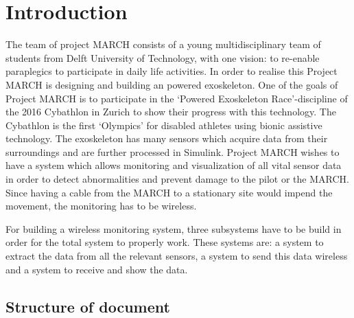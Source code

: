 \chapter{Introduction}
The team of project MARCH consists of a young multidisciplinary team of students from Delft University of Technology, with one vision: to re-enable paraplegics to participate in daily life activities. In order to realise this Project MARCH is designing and building an
powered exoskeleton. One of the goals of Project MARCH is to participate in the ‘Powered Exoskeleton Race’-discipline
of the 2016 Cybathlon in Zurich to show their progress with this technology. The Cybathlon is the first ‘Olympics’ for disabled athletes
using bionic assistive technology. 
The exoskeleton has many sensors which acquire data from their surroundings and are further processed in Simulink. Project MARCH wishes to have a system which allows monitoring and visualization of all vital sensor data in order to detect abnormalities and prevent damage to the pilot or the MARCH. Since having a cable from the MARCH to a stationary site would impend the movement, the monitoring has to be wireless. 		

For building a wireless monitoring system, three subsystems have to be build in order for the total system to properly work. These systems are: a system to extract the data from all the relevant sensors, a system to send this data wireless and a system to receive and show the data.
\section{Structure of document}
